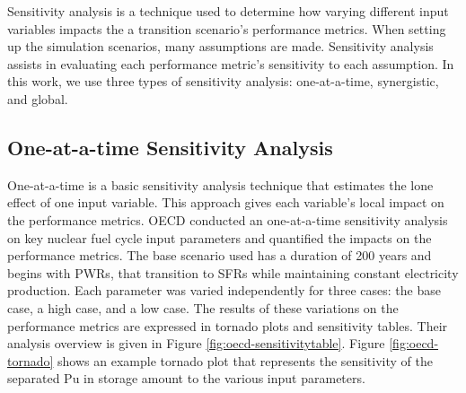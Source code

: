 Sensitivity analysis is a technique used to determine how varying
different input variables impacts the a transition scenario's performance metrics.
When setting up the simulation scenarios, many assumptions are made. 
Sensitivity analysis assists in evaluating each performance metric's 
sensitivity to each assumption. 
In this work, we use three types of sensitivity analysis: 
one-at-a-time, synergistic, and global.

\subsection{One-at-a-time Sensitivity Analysis}
One-at-a-time is a basic sensitivity analysis technique that estimates 
the lone effect of one input variable. 
This approach gives each variable's local impact 
on the performance metrics. 
OECD conducted an one-at-a-time sensitivity analysis \cite{noauthor_effects_2017} 
on key nuclear fuel cycle input parameters
and quantified the impacts on the performance metrics. 
The base scenario used has a duration of 200 years and begins 
with \glspl{PWR}, that transition to \glspl{SFR} while 
maintaining constant electricity production. 
Each parameter was varied independently for three cases: 
the base case, a high case, and a low case. 
The results of these variations on the performance metrics 
are expressed in tornado plots and sensitivity tables. 
Their analysis overview is given in Figure \ref{fig:oecd-sensitivitytable}. 
Figure \ref{fig:oecd-tornado} shows an example tornado plot that represents 
the sensitivity of the separated Pu in storage amount to the 
various input parameters. 

